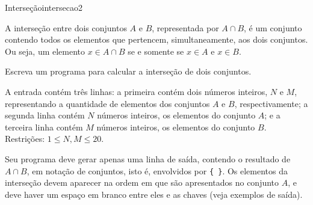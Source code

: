 \documentclass[12pt,a4paper,oneside]{article}
\begin{document}
\begin{problem}{Interseção}{intersecao}{2}

A interseção entre dois conjuntos $A$ e $B$, representada por $A \cap B$, é um conjunto contendo todos os elementos que pertencem, simultaneamente, aos dois conjuntos. Ou seja, um elemento $x \in A \cap B$ se e somente se $x \in A$ e $x \in B$.

Escreva um programa para calcular a interseção de dois conjuntos.

%

\InputFile

A entrada contém três linhas: a primeira contém dois números inteiros, $N$ e $M$, representando a quantidade de elementos dos conjuntos $A$ e $B$, respectivamente; a segunda linha contém $N$ números inteiros, os elementos do conjunto $A$; e a terceira linha contém $M$ números inteiros, os elementos do conjunto $B$. Restrições: $1 \leq N, M \leq 20$.

\OutputFile

Seu programa deve gerar apenas uma linha de saída, contendo o resultado de $A \cap B$, em notação de conjuntos, isto é, envolvidos por \texttt{\{ \}}. Os elementos da interseção devem aparecer na ordem em que são apresentados no conjunto $A$, e deve haver um espaço em branco entre eles e as chaves (veja exemplos de saída). 




\Example

\begin{example}
%
\end{example}

\begin{example}
%
\end{example}

\begin{example}
%
\end{example}




\end{problem}
\end{document}
